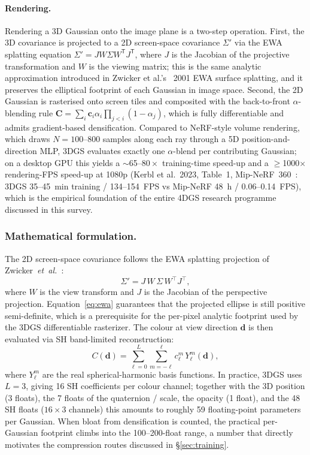 \paragraph{Rendering.}
Rendering a 3D Gaussian onto the image plane is a two-step
operation. First, the 3D covariance is projected to a 2D screen-space
covariance $\Sigma'$ via the EWA splatting equation
$\Sigma' = J W \Sigma W^{\mathsf{T}} J^{\mathsf{T}}$, where $J$ is
the Jacobian of the projective transformation and $W$ is the
viewing matrix; this is the same analytic approximation introduced
in Zwicker et al.'s~\cite{zwicker2001} 2001 EWA surface splatting, and it preserves the
elliptical footprint of each Gaussian in image space. Second, the
2D Gaussian is rasterised onto screen tiles and composited with the
back-to-front $\alpha$-blending rule
$\mathbf{C} = \sum_{i} \mathbf{c}_{i} \alpha_{i} \prod_{j < i}
(1 - \alpha_{j})$, which is fully differentiable and admits
gradient-based densification. Compared to NeRF-style volume
rendering, which draws $N = 100$--$800$ samples along each ray
through a 5D position-and-direction MLP, 3DGS evaluates exactly
one $\alpha$-blend per contributing Gaussian; on a desktop GPU
this yields a $\sim$65--$80\times$ training-time speed-up and
a $\geq$1000$\times$ rendering-FPS speed-up at 1080p
(Kerbl et al.\ 2023, Table~1, Mip-NeRF~360~\cite{barron2022mipnerf360}: 3DGS 35--45~min
training / 134--154~FPS vs Mip-NeRF 48~h / 0.06--0.14~FPS),
which is the empirical foundation of the entire 4DGS research
programme discussed in this survey.

\subsubsection{Mathematical formulation.}
The 2D screen-space covariance follows the EWA splatting
projection of Zwicker~\emph{et~al.}~\cite{kerbl20233dgs}:
\begin{equation}
  \Sigma' = J\,W\,\Sigma\,W^{\top}J^{\top},
  \label{eq:ewa}
\end{equation}
where $W$ is the view transform and $J$ is the Jacobian of the
perspective projection. Equation~\eqref{eq:ewa} guarantees that
the projected ellipse is still positive semi-definite, which is a
prerequisite for the per-pixel analytic footprint used by the
3DGS differentiable rasterizer. The colour at view direction
$\mathbf{d}$ is then evaluated via SH band-limited reconstruction:
\begin{equation}
  C(\mathbf{d}) = \sum_{\ell=0}^{L}\sum_{m=-\ell}^{\ell}
                 c_{\ell}^{m}\,Y_{\ell}^{m}(\mathbf{d}),
  \label{eq:sh}
\end{equation}
where $Y_{\ell}^{m}$ are the real spherical-harmonic basis
functions. In practice, 3DGS uses $L=3$, giving 16 SH coefficients
per colour channel; together with the 3D position (3 floats), the
7 floats of the quaternion / scale, the opacity (1 float), and the
48 SH floats ($16\times3$ channels) this amounts to roughly 59
floating-point parameters per Gaussian. When bloat from
densification is counted, the practical per-Gaussian footprint
climbs into the 100--200-float range, a number that directly
motivates the compression routes discussed in
\S\ref{sec:training}.

